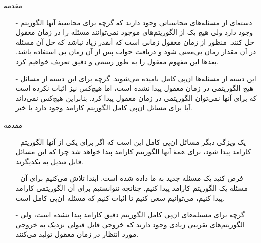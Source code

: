 \begin{frame}{مقدمه}
\begin{itemize}\itemr
\item[-]
دسته‌ای از مسئله‌های محاسباتی وجود دارند که گرچه برای محاسبهٔ آنها الگوریتم وجود دارد ولی هیچ یک از الگوریتم‌های موجود نمی‌توانند مسئله را در زمان معقول حل کنند. منظور از زمان معقول زمانی است که آنقدر زیاد نباشد که حل آن مسئله در آن مقدار زمان بی‌معنی شود و دریافت جواب پس از آن زمان بی استفاده باشد. بعدها این مفهوم معقول را به طور رسمی و دقیق تعریف خواهیم کرد.
\item[-]
این دسته از مسئله‌ها ان‌پی کامل
 نامیده می‌شوند. گرچه برای این دسته از مسائل هیچ الگوریتمی در زمان معقول پیدا نشده است، اما هیچ‌کس نیز اثبات نکرده است که برای آنها نمی‌توان الگوریتمی در زمان معقول
  پیدا کرد. بنابراین هیچ‌کس نمی‌داند آیا برای مسائل ان‌پی کامل الگوریتم کارامد
   وجود دارد یا خیر.
\end{itemize}
\end{frame}

\begin{frame}{مقدمه}
\begin{itemize}\itemr
\item[-]
یک ویژگی دیگر مسائل ان‌پی کامل این است که اگر برای یکی از آنها الگوریتم کارامد پیدا شود، برای همهٔ آنها الگوریتم کارامد پیدا خواهد شد چرا که این مسائل قابل تبدیل به یکدیگرند.
\item[-]
فرض کنید یک مسئله جدید به ما داده شده است. ابتدا تلاش می‌کنیم برای آن مسئله یک الگوریتم کارامد پیدا کنیم. چنانچه نتوانستیم برای آن الگوریتمی کارامد پیدا کنیم، می‌توانیم سعی کنیم تا اثبات کنیم که مسئله ان‌پی کامل است.
\item[-]
گرچه برای مسئله‌های ان‌پی کامل الگوریتم دقیق کارامد پیدا نشده است، ولی الگوریتم‌های تقریبی
 زیادی وجود دارند که خروجی قابل قبولی نزدیک به خروجی مورد انتظار در زمان معقول تولید می‌کنند.
\end{itemize}
\end{frame}


